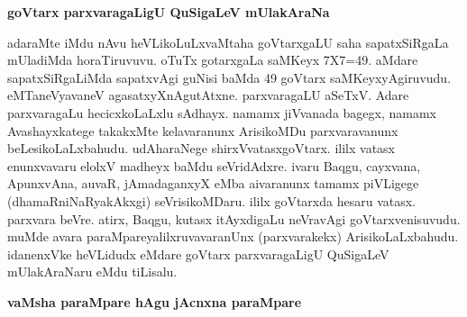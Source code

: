 {\bigskip
\noindent
{\large\bf goVtarx parxvaragaLigU QuSigaLeV mUlakAraNa}}\label{page139}
\medskip

\noindent
adaraMte iMdu nAvu heVLikoLuLxvaMtaha goVtarxgaLU saha sapatxSiRgaLa mUladiMda horaTiru\-vuvu. oTuTx gotarxgaLa saMKeyx {\rm 7X7=49.} aMdare sapatxSiRgaLiMda sapatxvAgi guNisi baMda {\rm 49} goVtarx saMKeyxyAgiruvudu. eMTaneVyavaneV agasatxyXnAgutAtxne. parxvaragaLU aSeTxV. Adare parxvaragaLu hecicx\-koLaLxlu sAdhayx. namamx jiVvanada bagegx, namamx Avashayxkatege takakxMte kelavaranunx ArisikoMDu parxvaravanunx beLesikoLaLxbahudu. udAharaNege shirxVvatasxgoVtarx. ililx vatasx enunxvavaru elolxV madheyx baMdu seVri\-dAdxre. ivaru Baqgu, cayxvana, ApunxvAna, auvaR, jAmadaganxyX eMba aivaranunx tamamx piVLigege (dhamaRniNaRya\-kAkxgi) seVrisikoMDaru. ililx goVtarxda hesaru vatasx. parxvara beVre. atirx, Baqgu, kutasx itAyxdigaLu neVravAgi goVtarxvenisuvudu. muMde avara paraMpareyalilxruvavaranUnx (parxvarakekx) ArisikoLaLxbahudu. idanenxVke heVLidudx eMdare goVtarx parxvaragaLigU QuSigaLeV mUlakAraNaru eMdu tiLisalu.

{\bigskip
\noindent
{\large\bf vaMsha paraMpare hAgu jAcnxna paraMpare}}\label{page139}
\medskip


